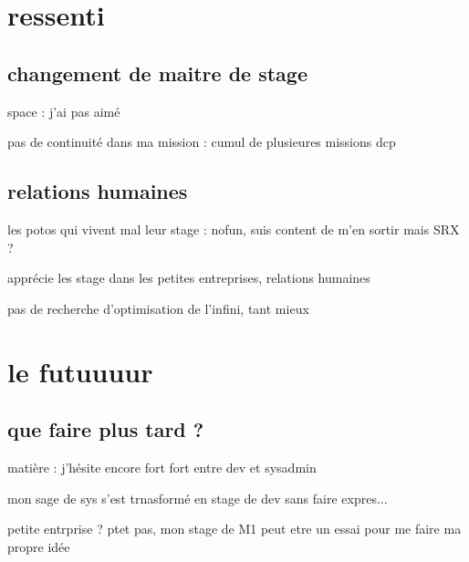 \section{ressenti}
\subsection{changement de maitre de stage}
space : j'ai pas aimé

pas de continuité dans ma mission : cumul de plusieures missions dcp

\subsection{relations humaines}
les potos qui vivent mal leur stage : nofun, suis content de m'en sortir mais SRX ?

apprécie les stage dans les petites entreprises, relations humaines

pas de recherche d'optimisation de l'infini, tant mieux


\section{le futuuuur}
\subsection{que faire plus tard ?}
matière : j'hésite encore fort fort entre dev et sysadmin

mon sage de sys s'est trnasformé en stage de dev sans faire expres...

petite entrprise ? ptet pas, mon stage de M1 peut etre un essai pour me faire ma propre idée


